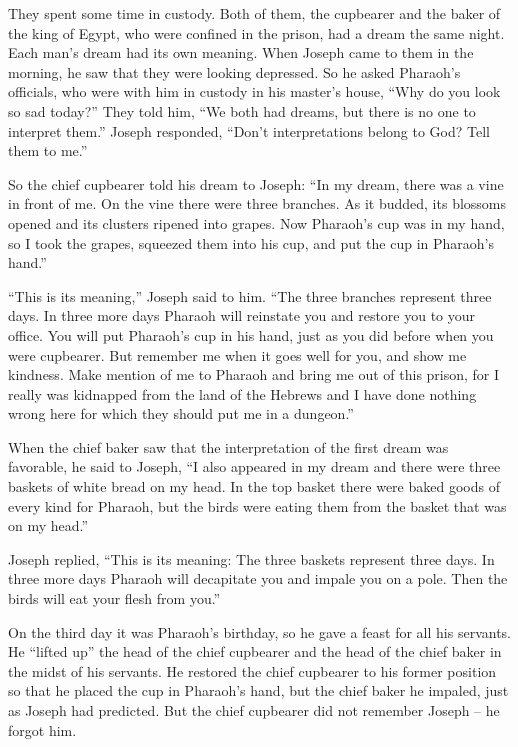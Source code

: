 {\par }{\PP They spent
some time
in custody.
Both of them,
the cupbearer
and the baker
of the king
of Egypt,
who
were confined
in the prison,
had a dream
the same night.
Each
man’s
dream
had its own meaning.
When Joseph
came
to
them in the morning,
he saw
that they were looking
depressed.
So he asked
Pharaoh’s
officials,
who
were with
him in custody
in his master’s
house,
“Why
do you look so sad
today?”
They told
him,
“We both had
dreams,
but there is no
one to
interpret
them.” Joseph
responded,
“Don’t
interpretations
belong to God? Tell
them to me.”
\par }{\PP {}So
the chief
cupbearer
told
his dream
to Joseph: “In my dream,
there
was a vine
in front of me.
On the vine
there were three
branches.
As it
budded,
its blossoms
opened
and its clusters
ripened
into grapes.
Now Pharaoh’s
cup
was in my hand,
so I took
the grapes,
squeezed
them into
his
cup,
and put
the cup
in Pharaoh’s
hand.”
\par }{\PP {}“This
is its meaning,”
Joseph
said
to him. “The three
branches
represent three
days.
In three
more
days
Pharaoh
will reinstate
you and restore
you to your office.
You will put
Pharaoh’s
cup
in his hand,
just
as
you did before
when
you were cupbearer.
But
remember
me when
it goes
well
for you, and show
me
kindness.
Make mention
of me to
Pharaoh
and bring me out
of this
prison,
for
I really was kidnapped
from the land
of the Hebrews
and I have
done
nothing
wrong here
for
which they should put
me in a dungeon.”
\par }{\PP {}When the chief
baker
saw
that
the interpretation
of the first dream was favorable,
he said
to
Joseph,
“I
also
appeared in my dream
and there were three
baskets
of white bread
on
my head.
In the top
basket
there were baked
goods
of every
kind for Pharaoh,
but the birds
were eating
them from
the basket
that was on
my head.”
\par }{\PP {}Joseph
replied,
“This
is its meaning: The three
baskets
represent three
days.
In three
more
days
Pharaoh
will decapitate
you and impale
you on
a pole.
Then the birds
will eat
your flesh from you.”
\par }{\PP {}On the third
day
it was Pharaoh’s
birthday,
so he gave
a feast
for all
his servants.
He “lifted
up” the head
of the chief
cupbearer
and the head
of the chief
baker
in the midst
of his servants.
He restored
the chief
cupbearer
to his former position
so that he placed
the cup
in
Pharaoh’s
hand,
but the chief
baker
he impaled,
just as
Joseph
had predicted.
But the chief
cupbearer
did not
remember
Joseph
– he forgot him.

}
